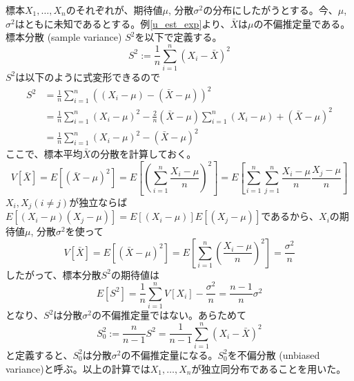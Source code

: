 \documentclass[uplatex,dvipdfmx]{jlreq}
\newcommand\term[1]{\textsf{#1}}
\begin{document}
\begin{example}[期待値が未知の場合の分散の不偏推定量]\label{u_est_var}
    標本$X_1, \dotsc, X_n$のそれぞれが、期待値$\mu$, 分散$\sigma^2$の分布にしたがうとする。今、$\mu$, $\sigma^2$はともに未知であるとする。例\ref{u_est_exp}より、$\bar{X}$は$\mu$の不偏推定量である。\term{標本分散 (sample variance)} $S^2$を以下で定義する。
    \begin{equation}
        S^2 := \frac{1}{n}\sum_{i=1}^n (X_i - \bar{X})^2
    \end{equation}
    $S^2$は以下のように式変形できるので
    \begin{equation}
        \begin{split}
            S^2
            &= \frac{1}{n}\sum_{i=1}^n ((X_i - \mu) - (\bar{X} - \mu))^2\\
            &= \frac{1}{n}\sum_{i=1}^n (X_i - \mu)^2
            - \frac{2}{n}(\bar{X} - \mu)\sum_{i=1}^n (X_i - \mu)
            +(\bar{X} - \mu)^2\\
            &= \frac{1}{n}\sum_{i=1}^n (X_i - \mu)^2
            -(\bar{X} - \mu)^2
        \end{split}
    \end{equation}
    ここで、標本平均$\bar{X}$の分散を計算しておく。
    \begin{equation}
        V[\bar{X}] = E[(\bar{X} - \mu)^2]
        = E\left[\left(\sum_{i=1}^n\frac{X_i - \mu}{n}\right)^2\right]
        = E\left[\sum_{i=1}^n\sum_{j=1}^n\frac{X_i - \mu}{n}\frac{X_j - \mu}{n}\right]
    \end{equation}
    $X_i, X_j (i \neq j)$が独立ならば$E[(X_i-\mu)(X_j-\mu)] = E[(X_i-\mu)]E[(X_j-\mu)]$であるから、$X_i$の期待値$\mu$, 分散$\sigma^2$を使って
    \begin{equation}
        V[\bar{X}] = E[(\bar{X} - \mu)^2]
        = E\left[\sum_{i=1}^n\left(\frac{X_i - \mu}{n}\right)^2\right]
        = \frac{\sigma^2}{n}
    \end{equation}
    したがって、標本分散$S^2$の期待値は
    \begin{equation}
        E[S^2]
        = \frac{1}{n}\sum_{i=1}^n V[X_i] - \frac{\sigma^2}{n}
        = \frac{n-1}{n}\sigma^2
    \end{equation}
    となり、$S^2$は分散$\sigma^2$の不偏推定量ではない。あらためて
    \begin{equation}
        S_0^2 := \frac{n}{n-1}S^2
        = \frac{1}{n-1}\sum_{i=1}^n (X_i - \bar{X})^2
    \end{equation}
    と定義すると、$S_0^2$は分散$\sigma^2$の不偏推定量になる。$S_0^2$を\term{不偏分散 (unbiased variance)}と呼ぶ。以上の計算では$X_1, \dotsc, X_n$が独立同分布であることを用いた。
\end{example}
\end{document}
